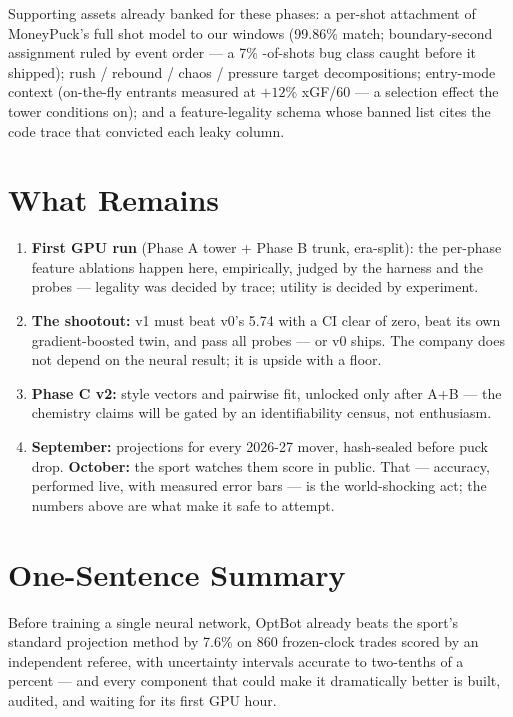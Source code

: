 \documentclass[11pt]{article}
\begin{document}
\noindent Supporting assets already banked for these phases: a per-shot attachment of
MoneyPuck's full shot model to our windows (99.86\% match; boundary-second assignment
ruled by event order --- a 7\% -of-shots bug class caught before it shipped); rush /
rebound / chaos / pressure target decompositions; entry-mode context (on-the-fly
entrants measured at $+12\%$ xGF/60 --- a selection effect the tower conditions on);
and a feature-legality schema whose banned list cites the code trace that convicted
each leaky column.

\section{What Remains}

\begin{enumerate}[nosep]
\item \textbf{First GPU run} (Phase A tower + Phase B trunk, era-split): the per-phase
feature ablations happen here, empirically, judged by the harness and the probes ---
legality was decided by trace; utility is decided by experiment.
\item \textbf{The shootout:} v1 must beat v0's 5.74 with a CI clear of zero, beat its
own gradient-boosted twin, and pass all probes --- or v0 ships. The company does not
depend on the neural result; it is upside with a floor.
\item \textbf{Phase C v2:} style vectors and pairwise fit, unlocked only after A+B ---
the chemistry claims will be gated by an identifiability census, not enthusiasm.
\item \textbf{September:} projections for every 2026-27 mover, hash-sealed before puck
drop. \textbf{October:} the sport watches them score in public. That --- accuracy,
performed live, with measured error bars --- is the world-shocking act; the numbers
above are what make it safe to attempt.
\end{enumerate}

\section*{One-Sentence Summary}

Before training a single neural network, OptBot already beats the sport's standard
projection method by 7.6\% on 860 frozen-clock trades scored by an independent referee,
with uncertainty intervals accurate to two-tenths of a percent --- and every component
that could make it dramatically better is built, audited, and waiting for its first
GPU hour.
\end{document}
